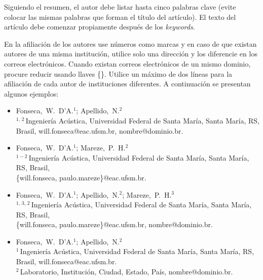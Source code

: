 Siguiendo el resumen, el autor debe listar hasta cinco palabras clave (evite colocar las mismas palabras que forman el título del artículo). El texto del artículo debe comenzar propiamente después de los \textit{keywords}.

En la afiliación de los autores use números como marcas y en caso de que existan autores de una misma institución, utilice solo una dirección y los diferencie en los correos electrónicos. Cuando existan correos electrónicos de un mismo dominio, procure reducir usando llaves \{\}. Utilice un máximo de dos líneas para la afiliación de cada autor de instituciones diferentes. A continuación se presentan algunos ejemplos:
%
\begin{flushleft}
\vspace{-0.25\baselineskip}
\begin{itemize}[topsep=-1ex,align=left,leftmargin=0.2cm] \itemsep=4pt

	\item Fonseca,~W.~D'A.$^1$; Apellido,~N.$^2$\\[6pt]	
	$^{1,\,2}$\,Ingeniería Acústica, Universidad Federal de Santa María, Santa María, RS, Brasil,
	will.fonseca@eac.ufsm.br, nombre@dominio.br.
	
	\item Fonseca,~W.~D'A.$^1$; Mareze,~P.~H.$^2$\\[6pt]	
	$^{1-2}$\,Ingeniería Acústica, Universidad Federal de Santa María, Santa María, RS, Brasil,\\
	\{will.fonseca, paulo.mareze\}@eac.ufsm.br.
	
	\item Fonseca,~W.~D'A.$^1$; Apellido,~N.$^2$; Mareze,~P.~H.$^3$\\[6pt]	
	$^{1,\,3,\,2}$\,Ingeniería Acústica, Universidad Federal de Santa María, Santa María, RS, Brasil,\\
	\{will.fonseca, paulo.mareze\}@eac.ufsm.br, nombre@dominio.br.

	\item Fonseca,~W.~D'A.$^1$; Apellido,~N.$^2$\\[6pt]	
	$^{1}$\,Ingeniería Acústica, Universidad Federal de Santa María, Santa María, RS, Brasil,
	will.fonseca@eac.ufsm.br.\\[4pt]		
	$^2$\,Laboratorio, Institución, Ciudad, Estado, País, nombre@dominio.br.	
\end{itemize}
\vspace{-0.4\baselineskip}
\end{flushleft}


